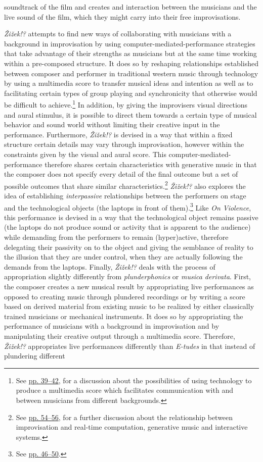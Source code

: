 soundtrack of the film and creates and interaction between the musicians and the live sound of the film, which they might carry into their free improvisations.

\emph{\v{Z}i\v{z}ek!?} attempts to find new ways of collaborating with musicians with a background in improvisation by using computer-mediated-performance strategies that take advantage of their strengths as musicians but at the same time working within a pre-composed structure. It does so by reshaping relationships established between composer and performer in traditional western music through technology by using a multimedia score to transfer musical ideas and intention as well as to facilitating certain types of group playing and synchronicity that otherwise would be difficult to achieve.\footnote{See \hyperlink{superscore}{pp. 39--42}, for a discussion about the possibilities of using technology to produce a multimedia score which facilitates communication with and between musicians from different backgrounds.} In addition, by giving the improvisers visual directions and aural stimulus, it is possible to direct them towards a certain type of musical behavior and sound world without limiting their creative input in the performance. Furthermore, \emph{\v{Z}i\v{z}ek!?} is devised in a way that within a fixed structure certain details may vary through improvisation, however within the constraints given by the visual and aural score. This computer-mediated-performance therefore shares certain characteristics with generative music in that the composer does not specify every detail of the final outcome but a set of possible outcomes that share similar characteristics.\footnote{See \hyperlink{realtimepos}{pp. 54--56}, for a further discussion about the relationship between improvisation and real-time computation, generative music and interactive systems.} \emph{\v{Z}i\v{z}ek!?} also explores the idea of establishing \emph{interpassive} relationships between the performers on stage and the technological objects (the laptops in front of them).\footnote{See \hyperlink{interpassiv}{pp. 46--50}.} Like \emph{On Violence}, this performance is devised in a way that the technological object remains passive (the laptops do not produce sound or activity that is apparent to the audience) while demanding from the performers to remain (hyper)active, therefore delegating their passivity on to the object and giving the semblance of reality to the illusion that they are under control, when they are actually following the demands from the laptops. Finally, \emph{\v{Z}i\v{z}ek!?} deals with the process of appropriation slightly differently from \emph{plunderphonics} or \emph{musica derivata}. First, the composer creates a new musical result by appropriating live performances as opposed to creating music through plundered recordings or by writing a score based on derived material from existing music to be realized by either classically trained musicians or mechanical instruments. It does so by appropriating the performance of musicians with a background in improvisation and by manipulating their creative output through a multimedia score. Therefore, \emph{\v{Z}i\v{z}ek!?} appropriates live performances differently than \emph{E-tudes} in that instead of plundering different 